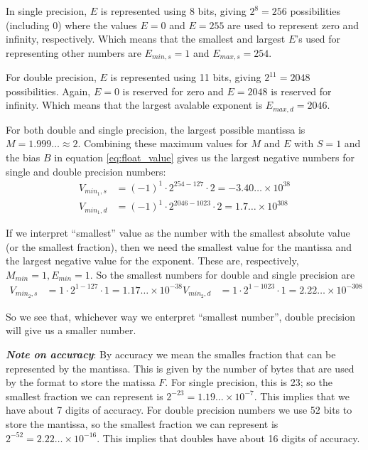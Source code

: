 In single precision, $E$ is represented using 8 bits, giving $2^8 = 256$ possibilities (including 0) where the values $E=0$ and $E=255$ are used to represent zero and infinity, respectively. Which means that the smallest and largest $E$'s used for representing other numbers are $E_{min,s}=1$ and $E_{max,s}=254$.

For double precision, $E$ is represented using 11 bits, giving $2^{11}=2048$ possibilities. Again, $E=0$ is reserved for zero and $E=2048$ is reserved for infinity. Which means that the largest avalable exponent is $E_{max,d}=2046$.

For both double and single precision, the largest possible mantissa is $M=1.999\dots \approx 2$. Combining these maximum values for $M$ and $E$ with $S=1$ and the bias $B$ in equation \eqref{eq:float_value} gives us the largest negative numbers for single and double precision numbers:
\begin{align}
    V_{min_1, s} &= (-1)^1 \cdot 2^{254-127} \cdot 2 = -3.40\dots\times 10^{38} \\
    V_{min_1, d} &= (-1)^1 \cdot 2^{2046-1023} \cdot 2 = 1.7\dots \times 10^{308}
\end{align}

If we interpret ``smallest'' value as the number with the smallest absolute value (or the smallest fraction), then we need the smallest value for the mantissa and the largest negative value for the exponent. These are, respectively, $M_{min} = 1, E_{min} = 1$. So the smallest numbers for double and single precision are
\begin{align}
    V_{min_2, s} &= 1 \cdot 2^{1-127} \cdot 1 = 1.17\dots \times 10^{-38}
    V_{min_2, d} &= 1 \cdot 2^{1-1023} \cdot 1 = 2.22\dots \times 10^{-308}
\end{align}

So we see that, whichever way we enterpret ``smallest number'', double precision will give us a smaller number.

\vspace*{1em}\noindent \textbf{\emph{Note on accuracy}}: By accuracy we mean the smalles fraction that can be represented by the mantissa. This is given by the number of bytes that are used by the format to store the matissa $F$. For single precision, this is 23; so the smallest fraction we can represent is $2^{-23} = 1.19\dots \times 10^{-7}$. This implies that we have about 7 digits of accuracy. For double precision numbers we use 52 bits to store the mantissa, so the smallest fraction we can represent is $2^{-52}=2.22\dots \times 10^{-16}$. This implies that doubles have about 16 digits of accuracy.

